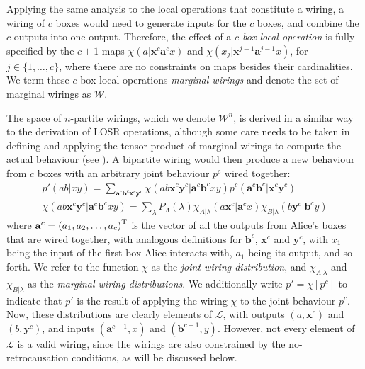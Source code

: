 \documentclass[10pt, a4paper]{article}
\numberwithin{equation}{section} %
\theoremstyle{definition}
\theoremstyle{plain}
\newcommand{\dintv}[2]{\mathopen\{#1,\ldots,#2\mathclose\}}
\newcommand{\?}{\mathrel{?}} %
\newcommand{\cvec}[1]{\boldsymbol{\mathbf{#1}}}    %
\newcommand{\sW}{\mathcal{W}}
\newcommand{\Ls}{\mathcal{L}}
\begin{document}
              Applying the same analysis to the local operations that constitute a wiring, a wiring of \(c\) boxes would need to generate inputs for the \(c\) boxes, and combine the \(c\) outputs into one output. Therefore, the effect of a \emph{\(c\)-box local operation} is fully specified by the \(c+1\) maps \(\chi(a|\cvec{x}^c\cvec{a}^{c}x)\) and \(\chi(x_j|\cvec{x}^{j-1}\cvec{a}^{j-1}x)\), for \(j \in \dintv{1}{c}\), where there are no constraints on maps besides their cardinalities. We term these \(c\)-box local operations \emph{marginal wirings} and denote the set of marginal wirings as \(\sW\).

              The space of \(n\)-partite wirings, which we denote \(\sW^n\), is derived in a similar way to the derivation of LOSR operations, although some care needs to be taken in defining and applying the tensor product of marginal wirings to compute the actual behaviour (see ). A bipartite wiring would then produce a new behaviour from \(c\) boxes with an arbitrary joint behaviour \(p^c\) wired together:
              \begin{gather}
                p'(ab|xy) = \sum_{\cvec{a}^c\cvec{b}^c\cvec{x}^c\cvec{y}^c} \chi(ab\cvec{x}^c\cvec{y}^c|\cvec{a}^c\cvec{b}^cxy) p^c(\cvec{a}^c\cvec{b}^c|\cvec{x}^c\cvec{y}^c)\label{eqn:jwirdistdef} \\
                \chi(ab\cvec{x}^c\cvec{y}^c|\cvec{a}^c\cvec{b}^cxy) = \sum_{\lambda} P_{\Lambda}(\lambda) \chi_{A|\lambda}(a\cvec{x}^c|\cvec{a}^cx) \chi_{B|\lambda}(b\cvec{y}^c|\cvec{b}^cy) \label{eqn:mwirdistdef}
              \end{gather}
              where \(\cvec{a}^c = {(a_1, a_2, \ldots, a_c)}^{\rm T}\) is the vector of all the outputs from Alice's boxes that are wired together, with analogous definitions for \(\cvec{b}^c\), \(\cvec{x}^c\) and \(\cvec{y}^c\), with \(x_1\) being the input of the first box Alice interacts with, \(a_1\) being its output, and so forth. We refer to the function \(\chi\) as the \emph{joint wiring distribution}, and \(\chi_{A|\lambda}\) and \(\chi_{B|\lambda}\) as the \emph{marginal wiring distributions}. We additionally write \(p' = \chi[p^c]\) to indicate that \(p'\) is the result of applying the wiring \(\chi\) to the joint behaviour \(p^c\). Now, these distributions are clearly elements of \(\Ls\), with outputs \((a, \cvec{x}^c)\) and \((b, \cvec{y}^c)\), and inputs \((\cvec{a}^{c-1}, x)\) and \((\cvec{b}^{c-1}, y)\). However, not every element of \(\Ls\) is a valid wiring, since the wirings are also constrained by the no-retrocausation conditions, as will be discussed below.
\end{document}

